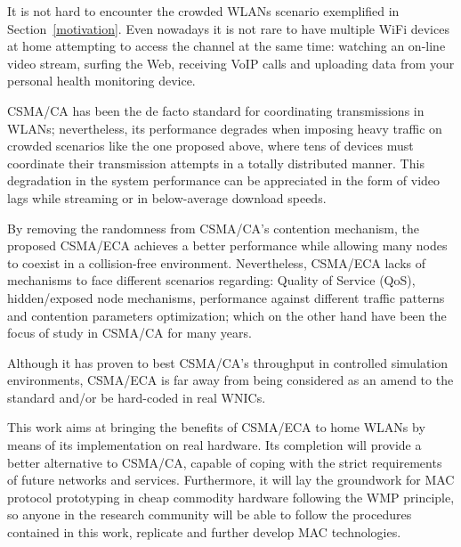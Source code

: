 It is not hard to encounter the crowded WLANs scenario exemplified in Section~\ref{motivation}. Even nowadays it is not rare to have multiple WiFi devices at home attempting to access the channel at the same time: watching an on-line video stream, surfing the Web, receiving VoIP calls and uploading data from your personal health monitoring device.

CSMA/CA has been the de facto standard for coordinating transmissions in WLANs; nevertheless, its performance degrades when imposing heavy traffic on crowded scenarios like the one proposed above, where tens of devices must coordinate their transmission attempts in a totally distributed manner. This degradation in the system performance can be appreciated in the form of video lags while streaming or in below-average download speeds.

By removing the randomness from CSMA/CA's contention mechanism, the proposed CSMA/ECA achieves a better performance while allowing many nodes to coexist in a collision-free environment. Nevertheless, CSMA/ECA lacks of mechanisms to face different scenarios regarding: Quality of Service (QoS), hidden/exposed node mechanisms, performance against different traffic patterns and contention parameters optimization; which on the other hand have been the focus of study in CSMA/CA for many years.

Although it has proven to best CSMA/CA's throughput in controlled simulation environments, CSMA/ECA is far away from being considered as an amend to the standard and/or be hard-coded in real WNICs.

This work aims at bringing the benefits of CSMA/ECA to home WLANs by means of its implementation on real hardware. Its completion will provide a better alternative to CSMA/CA, capable of coping with the strict requirements of future networks and services. Furthermore, it will lay the groundwork for MAC protocol prototyping in cheap commodity hardware following the WMP principle, so anyone in the research community will be able to follow the procedures contained in this work, replicate and further develop MAC technologies.